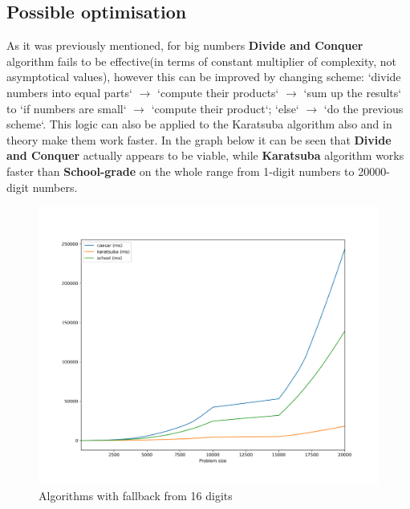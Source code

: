 \documentclass[12pt, oneside]{article}
\begin{document}
\subsection{Possible optimisation}
As it was previously mentioned, for big numbers \textbf{Divide and Conquer} algorithm fails to be effective(in terms of constant multiplier of complexity, not asymptotical values), however this can be improved by changing scheme: `divide numbers into equal parts` $\to$ `compute their products` $\to$  `sum up the results` to `if numbers are small` $\to$ `compute their product`; `else` $\to$ `do the previous scheme`. This logic can also be applied to the Karatsuba algorithm also and in theory make them work faster. In the graph below it can be seen that \textbf{Divide and Conquer} actually appears to be viable, while \textbf{Karatsuba} algorithm works faster than \textbf{School-grade} on the whole range from 1-digit numbers to 20000-digit numbers.  
\begin{figure}[h]
\caption{Algorithms with fallback from 16 digits}

\includegraphics[width=1\textwidth]{optimised}
\end{figure}
\clearpage
\end{document}
